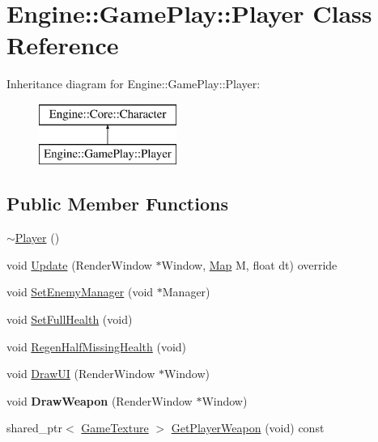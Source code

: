 \hypertarget{class_engine_1_1_game_play_1_1_player}{}\section{Engine\+:\+:Game\+Play\+:\+:Player Class Reference}
\label{class_engine_1_1_game_play_1_1_player}
Inheritance diagram for Engine\+:\+:Game\+Play\+:\+:Player\+:\begin{figure}[H]
\begin{center}
\leavevmode
\includegraphics[height=2.000000cm]{class_engine_1_1_game_play_1_1_player}
\end{center}
\end{figure}
\subsection*{Public Member Functions}
\begin{DoxyCompactItemize}
\item 
\hyperlink{class_engine_1_1_game_play_1_1_player_a39c82fa94afe71949a7fff50fed2a4d0}{$\sim$\+Player} ()
\item 
void \hyperlink{class_engine_1_1_game_play_1_1_player_a06c682bf13c20fb2390807ec681b0121}{Update} (Render\+Window $\ast$Window, \hyperlink{class_engine_1_1_core_1_1_map}{Map} M, float dt) override
\item 
void \hyperlink{class_engine_1_1_game_play_1_1_player_adedc5552f70e5495ca1391b6f6143bec}{Set\+Enemy\+Manager} (void $\ast$Manager)
\item 
void \hyperlink{class_engine_1_1_game_play_1_1_player_a426ebc69b0607902e73563655ad66693}{Set\+Full\+Health} (void)
\item 
void \hyperlink{class_engine_1_1_game_play_1_1_player_aad2c7f9e75ef259e202be0d00924ec1d}{Regen\+Half\+Missing\+Health} (void)
\item 
void \hyperlink{class_engine_1_1_game_play_1_1_player_a4b3e08479cfc81c66eadf1e9da4a47fe}{Draw\+UI} (Render\+Window $\ast$Window)
\item 
\mbox{\label{class_engine_1_1_game_play_1_1_player_a3705c78e4c21631432c4c21a0a4e4084}} 
void {\bfseries Draw\+Weapon} (Render\+Window $\ast$Window)
\item 
shared\+\_\+ptr$<$ \hyperlink{class_engine_1_1_core_1_1_game_texture}{Game\+Texture} $>$ \hyperlink{class_engine_1_1_game_play_1_1_player_a22261e9c06350f20de748418085dd26a}{Get\+Player\+Weapon} (void) const
\end{DoxyCompactItemize}
